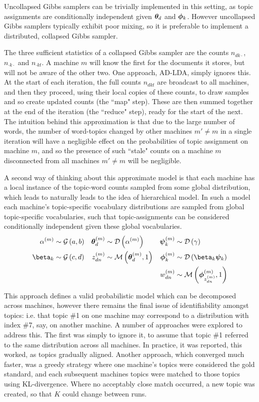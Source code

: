 Uncollapsed Gibbs samplers can be trivially implemented in this setting, as topic assignments are conditionally independent given ${ \bm \theta_d }$ and ${ \bm \phi_k }$. However uncollapsed Gibbs samplers typically exhibit poor mixing, so it is preferable to implement a distributed, collapsed Gibbs sampler.

The three sufficient statistics of a collapsed Gibbs sampler are the counts $n_{dk\cdot}$, $n_{\cdot k \cdot}$ and $n_{\cdot k t}$. A machine $m$ will know the first for the documents it stores, but will not be aware of the other two. One approach, AD-LDA, simply ignores this. At the start of each iteration, the full counts $n_{dkt}$ are broadcast to all machines, and then they proceed, using their local copies of these counts, to draw samples and so create updated counts (the ``map" step). These are then summed together at the end of the iteration (the ``reduce" step), ready for the start of the next. The intuition behind this approximation is that due to the large number of words, the number of word-topics changed by other machines $m' \neq m$ in a single iteration will have a negligible effect on the probabilities of topic assignment on machine $m$, and so the presence of such ``stale" counts on a machine $m$ disconnected from all machines $m' \neq m$ will be negligible.

A second way of thinking about this approximate model is that each machine has a local instance of the topic-word counts sampled from some global distribution, which leads to naturally leads to the idea of hierarchical model. In such a model each machine's topic-specific vocabulary distributions are sampled from global topic-specific vocabularies, such that topic-assignments can be considered conditionally independent given these global vocabularies.
\begin{align}
\alpha^{(m)} & \sim \gam{a}{b} &
\vv{\theta}_d^{(m)} & \sim \dir{\alpha^{(m)}} &
\vv{\psi}_k^{(m)} & \sim \dir{\gamma} \\
\beta_k & \sim \gam{c}{d} &
z_{dn}^{(m)} & \sim \muln{\vv{\theta}_d^{(m)}}{1} &
\vv{\phi}_k^{(m)} & \sim \dir{\beta_k \vv{\psi}_k} \\
& &
& &
w_{dn}^{(m)} & \sim \muln{\vv{\phi}_{z_{dn}^{(m)}}^{(m)}}{1}
\end{align}

This approach defines a valid probabilistic model which can be decomposed across machines, however there remains the final issue of identifiability amongst topics: i.e. that topic \#1 on one machine may correspond to a distribution with index \#7, say, on another machine. A number of approaches were explored to address this. The first was simply to ignore it, to assume that topic \#1 referred to the same distribution across all machines. In practice, it was reported, this worked, as topics gradually aligned. Another approach, which converged much faster, was a greedy strategy where one machine's topics were considered the gold standard, and each subsequent machines topics were matched to those topics using KL-divergence. Where no acceptably close match occurred, a new topic was created, so that $K$ could change between runs. 

